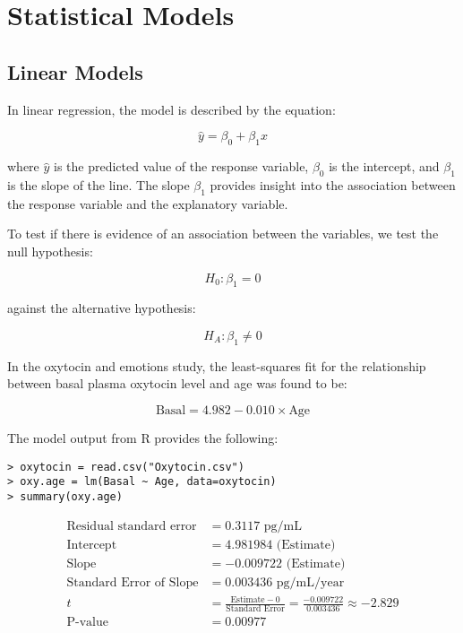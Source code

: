 \documentclass{article}
\begin{document}
\section{Statistical Models}

\subsection{Linear Models}

In linear regression, the model is described by the equation:

\[
\hat{y} = \beta_0 + \beta_1 x
\]

where \( \hat{y} \) is the predicted value of the response variable, \( \beta_0 \) is the intercept, and \( \beta_1 \) is the slope of the line. The slope \( \beta_1 \) provides insight into the association between the response variable and the explanatory variable.

To test if there is evidence of an association between the variables, we test the null hypothesis:

\[
H_0: \beta_1 = 0
\]

against the alternative hypothesis:

\[
H_A: \beta_1 \neq 0
\]

In the oxytocin and emotions study, the least-squares fit for the relationship between basal plasma oxytocin level and age was found to be:

\[
\text{Basal} = 4.982 - 0.010 \times \text{Age}
\]

The model output from R provides the following:

\begin{verbatim}
> oxytocin = read.csv("Oxytocin.csv")
> oxy.age = lm(Basal ~ Age, data=oxytocin)
> summary(oxy.age)
\end{verbatim}

\begin{align*}
\text{Residual standard error} &= 0.3117 \text{ pg/mL} \\
\text{Intercept} &= 4.981984 \text{ (Estimate)} \\
\text{Slope} &= -0.009722 \text{ (Estimate)} \\
\text{Standard Error of Slope} &= 0.003436 \text{ pg/mL/year} \\
t &= \frac{\text{Estimate} - 0}{\text{Standard Error}} = \frac{-0.009722}{0.003436} \approx -2.829 \\
\text{P-value} &= 0.00977
\end{align*}
\end{document}
